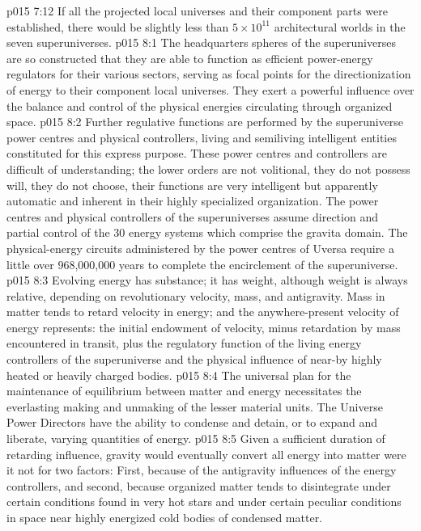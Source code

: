 \vs p015 7:12 \pc If all the projected local universes and their component parts were established, there would be slightly less than $5 \times 10^{11}$ architectural worlds in the seven superuniverses.
\vs p015 8:1 The headquarters spheres of the superuniverses are so constructed that they are able to function as efficient power\hyp{}energy regulators for their various sectors, serving as focal points for the directionization of energy to their component local universes. They exert a powerful influence over the balance and control of the physical energies circulating through organized space.
\vs p015 8:2 Further regulative functions are performed by the superuniverse power centres and physical controllers, living and semiliving intelligent entities constituted for this express purpose. These power centres and controllers are difficult of understanding; the lower orders are not volitional, they do not possess will, they do not choose, their functions are very intelligent but apparently automatic and inherent in their highly specialized organization. The power centres and physical controllers of the superuniverses assume direction and partial control of the 30 energy systems which comprise the gravita domain. The physical\hyp{}energy circuits administered by the power centres of Uversa require a little over 968,000,000 years to complete the encirclement of the superuniverse.
\vs p015 8:3 \pc Evolving energy has substance; it has weight, although weight is always relative, depending on revolutionary velocity, mass, and antigravity. Mass in matter tends to retard velocity in energy; and the anywhere\hyp{}present velocity of energy represents: the initial endowment of velocity, minus retardation by mass encountered in transit, plus the regulatory function of the living energy controllers of the superuniverse and the physical influence of near\hyp{}by highly heated or heavily charged bodies.
\vs p015 8:4 The universal plan for the maintenance of equilibrium between matter and energy necessitates the everlasting making and unmaking of the lesser material units. The Universe Power Directors have the ability to condense and detain, or to expand and liberate, varying quantities of energy.
\vs p015 8:5 Given a sufficient duration of retarding influence, gravity would eventually convert all energy into matter were it not for two factors: First, because of the antigravity influences of the energy controllers, and second, because organized matter tends to disintegrate under certain conditions found in very hot stars and under certain peculiar conditions in space near highly energized cold bodies of condensed matter.
